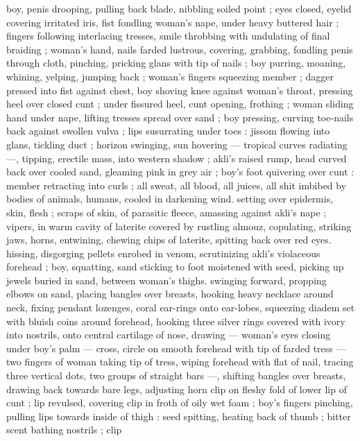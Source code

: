 boy, penis drooping, pulling back blade, nibbling soiled point ; eyes 
closed, eyelid covering irritated iris, fist fondling woman's nape, 
under heavy buttered hair ; fingers following interlacing tresses, 
smile throbbing with undulating of final braiding ; woman's hand, 
nails farded lustrous, covering, grabbing, fondling penis through 
cloth, pinching, pricking glans with tip of nails ; boy purring, 
moaning, whining, yelping, jumping back ; woman's fingers 
squeezing member ; dagger pressed into fist against chest, boy 
shoving knee against woman's throat, pressing heel over closed cunt 
; under fissured heel, cunt opening, frothing ; woman sliding hand 
under nape, lifting tresses spread over sand ; boy pressing, curving 
toe-nails back against swollen vulva ; lips susurrating under toes : 
jissom flowing into glans, tickling duct ; horizon swinging, sun 
hovering --- tropical curves radiating ---, tipping, erectile mass, into 
western shadow ; akli's raised rump, head curved back over cooled 
sand, gleaming pink in grey air ; boy's foot quivering over cunt : 
member retracting into curls ; all sweat, all blood, all juices, all shit 
imbibed by bodies of animals, humans, cooled in darkening wind. 
setting over epidermis, skin, flesh ; scraps of skin, of parasitic 
fleece, amassing against akli's nape ; vipers, in warm cavity of 
laterite covered by rustling almouz, copulating, striking jaws, horns, 
entwining, chewing chips of laterite, spitting back over red eyes. 
hissing, disgorging pellets enrobed in venom, scrutinizing akli's 
violaceous forehead ; boy, squatting, sand sticking to foot moistened 
with seed, picking up jewels buried in sand, between woman's thighs. 
swinging forward, propping elbows on sand, placing bangles over 
breasts, hooking heavy necklace around neck, fixing pendant 
lozenges, coral ear-rings onto ear-lobes, squeezing diadem set with 
bluish coins around forehead, hooking three silver rings covered with 
ivory into nostrils, onto central cartilage of nose, drawing --- 
woman's eyes closing under boy's palm --- cross, circle on smooth 
forehead with tip of farded tress --- two fingers of woman taking tip 
of tress, wiping forehead with flat of nail, tracing three vertical dots, 
two groups of straight bars ---, shifting bangles over breasts, 
drawing back towards bare legs, adjusting horn clip on fleshy fold of 
lower lip of cunt ; lip revulsed, covering clip in froth of oily wet foam 
; boy's fingers pinching, pulling lips towards inside of thigh : seed 
spitting, heating back of thumb ; bitter scent bathing nostrils ; clip 
